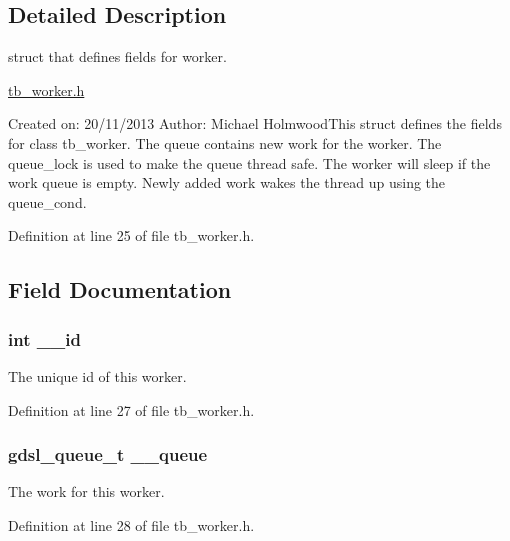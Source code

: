 \subsection{Detailed Description}
struct that defines fields for worker. 

\hyperlink{tb__worker_8h}{tb\-\_\-worker.\-h}

Created on\-: 20/11/2013 Author\-: Michael Holmwood\-This struct defines the fields for class tb\-\_\-worker. The queue contains new work for the worker. The queue\-\_\-lock is used to make the queue thread safe. The worker will sleep if the work queue is empty. Newly added work wakes the thread up using the queue\-\_\-cond. 

Definition at line 25 of file tb\-\_\-worker.\-h.



\subsection{Field Documentation}
\hypertarget{structtb__worker__t_a4b75564f2d4bac6720918785d0de5034}{
\subsubsection[{\-\_\-\-\_\-id}]{\setlength{\rightskip}{0pt plus 5cm}int \-\_\-\-\_\-id}}\label{structtb__worker__t_a4b75564f2d4bac6720918785d0de5034}


The unique id of this worker. 



Definition at line 27 of file tb\-\_\-worker.\-h.

\hypertarget{structtb__worker__t_aea4c15677ebae0f50f9f4684804d7987}{
\subsubsection[{\-\_\-\-\_\-queue}]{\setlength{\rightskip}{0pt plus 5cm}gdsl\-\_\-queue\-\_\-t \-\_\-\-\_\-queue}}\label{structtb__worker__t_aea4c15677ebae0f50f9f4684804d7987}


The work for this worker. 



Definition at line 28 of file tb\-\_\-worker.\-h.

